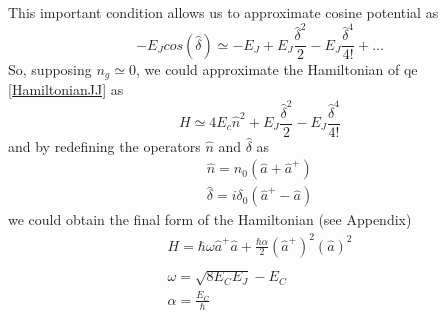 This important condition allows us to approximate cosine potential as 
\begin{equation}
    -E_Jcos(\hat{\delta}) \simeq -E_J + E_J\frac{\hat{\delta}^2}{2} -E_J\frac{\hat{\delta}^4 }{4!} + ...
\end{equation}
So, supposing $n_g \simeq 0$, we could approximate the Hamiltonian of qe \ref{HamiltonianJJ} as
\begin{equation}
    H \simeq 4E_c\hat{n}^2 + E_J\frac{\hat{\delta}^2}{2} -E_J\frac{\hat{\delta}^4 }{4!}
\end{equation}
and by redefining the operators $\hat{n}$ and $\hat{\delta}$ as
\begin{equation}
    \begin{split}
        \hat{n} = n_0(\hat{a} + \hat{a}^+)\\
        \hat{\delta} = i\delta_{0}(\hat{a}^+ - \hat{a})
    \end{split}
\end{equation}
we could obtain the final form of the Hamiltonian (see Appendix)
\begin{equation}
\label{HamiltonianSimplified}
    \begin{split}
        H = \hbar\omega\hat{a}^+\hat{a} + \frac{\hbar\alpha}{2}(\hat{a}^+)^2(\hat{a})^2\\ \\
        \omega = \sqrt{8E_CE_J} - E_C \\  \alpha = \frac{E_C}{\hbar} 
        \end{split}
\end{equation} 

